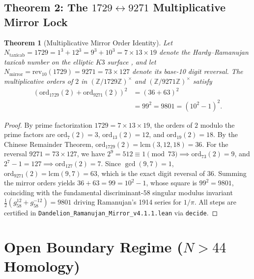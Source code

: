\documentclass[aps,prl,twocolumn,superscriptaddress,10pt]{revtex4-2}
\newtheorem{theorem}{Theorem}[section]
\begin{document}
\subsection{Theorem 2: The \texorpdfstring{$1729 \leftrightarrow 9271$}{1729 <-> 9271} Multiplicative Mirror Lock}

\begin{theorem}[Multiplicative Mirror Order Identity]
\label{thm:mirror_1729}
Let $N_{\text{taxicab}} = 1729 = 1^3 + 12^3 = 9^3 + 10^3 = 7 \times 13 \times 19$ denote the Hardy--Ramanujan taxicab number on the elliptic $K3$ surface \cite{Ono2015}, and let $N_{\text{mirror}} = \text{rev}_{10}(1729) = 9271 = 73 \times 127$ denote its base-10 digit reversal. The multiplicative orders of $2$ in $(\mathbb{Z}/1729\mathbb{Z})^\times$ and $(\mathbb{Z}/9271\mathbb{Z})^\times$ satisfy
\begin{equation}
\begin{aligned}
\left(\text{ord}_{1729}(2) + \text{ord}_{9271}(2)\right)^2 &= (36 + 63)^2 \\
&= 99^2 = 9801 = (10^2 - 1)^2.
\end{aligned}
\label{eq:mirror_9801}
\end{equation}
\end{theorem}

\begin{proof}
By prime factorization $1729 = 7 \times 13 \times 19$, the orders of $2$ modulo the prime factors are $\text{ord}_7(2) = 3$, $\text{ord}_{13}(2) = 12$, and $\text{ord}_{19}(2) = 18$. By the Chinese Remainder Theorem, $\text{ord}_{1729}(2) = \text{lcm}(3, 12, 18) = 36$. For the reversal $9271 = 73 \times 127$, we have $2^9 = 512 \equiv 1 \pmod{73} \implies \text{ord}_{73}(2) = 9$, and $2^7 - 1 = 127 \implies \text{ord}_{127}(2) = 7$. Since $\gcd(9,7) = 1$, $\text{ord}_{9271}(2) = \text{lcm}(9, 7) = 63$, which is the exact digit reversal of $36$. Summing the mirror orders yields $36 + 63 = 99 = 10^2 - 1$, whose square is $99^2 = 9801$, coinciding with the fundamental discriminant-$58$ singular modulus invariant $\frac{1}{2}(g_{58}^{12} + g_{58}^{-12}) = 9801$ driving Ramanujan's 1914 series for $1/\pi$. All steps are certified in \texttt{Dandelion\_\allowbreak Ramanujan\_\allowbreak Mirror\_\allowbreak v4.1.1.lean} via \texttt{decide}.
\end{proof}

\section{Open Boundary Regime (\texorpdfstring{$N > 44$}{N > 44} Homology)}
\end{document}
